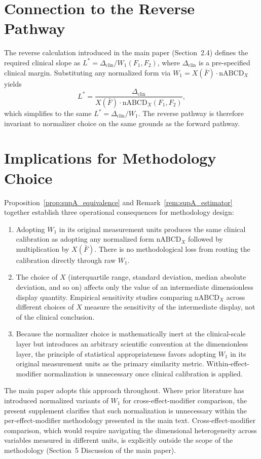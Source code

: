 \documentclass[11pt]{article}
\begin{document}
\section{Connection to the Reverse Pathway}\label{sec:supA_reverse}

The reverse calculation introduced in the main paper (Section~2.4) defines the required clinical slope as $L^* = \Delta_{\text{clin}} / W_1(F_1, F_2)$, where $\Delta_{\text{clin}}$ is a pre-specified clinical margin. Substituting any normalized form via $W_1 = X(\bar{F}) \cdot \text{nABCD}_X$ yields
\[
L^* = \frac{\Delta_{\text{clin}}}{X(\bar{F}) \cdot \text{nABCD}_X(F_1, F_2)},
\]
which simplifies to the same $L^* = \Delta_{\text{clin}} / W_1$. The reverse pathway is therefore invariant to normalizer choice on the same grounds as the forward pathway.

\section{Implications for Methodology Choice}\label{sec:supA_implications}

Proposition~\ref{prop:supA_equivalence} and Remark~\ref{rem:supA_estimator} together establish three operational consequences for methodology design:

\begin{enumerate}
\item Adopting $W_1$ in its original measurement units produces the same clinical calibration as adopting any normalized form $\text{nABCD}_X$ followed by multiplication by $X(\bar{F})$. There is no methodological loss from routing the calibration directly through raw $W_1$.
\item The choice of $X$ (interquartile range, standard deviation, median absolute deviation, and so on) affects only the value of an intermediate dimensionless display quantity. Empirical sensitivity studies comparing $\text{nABCD}_X$ across different choices of $X$ measure the sensitivity of the intermediate display, not of the clinical conclusion.
\item Because the normalizer choice is mathematically inert at the clinical-scale layer but introduces an arbitrary scientific convention at the dimensionless layer, the principle of statistical appropriateness favors adopting $W_1$ in its original measurement units as the primary similarity metric. Within-effect-modifier normalization is unnecessary once clinical calibration is applied.
\end{enumerate}

The main paper adopts this approach throughout. Where prior literature has introduced normalized variants of $W_1$ for cross-effect-modifier comparison, the present supplement clarifies that such normalization is unnecessary within the per-effect-modifier methodology presented in the main text. Cross-effect-modifier comparison, which would require navigating the dimensional heterogeneity across variables measured in different units, is explicitly outside the scope of the methodology (Section~5 Discussion of the main paper).
\end{document}
